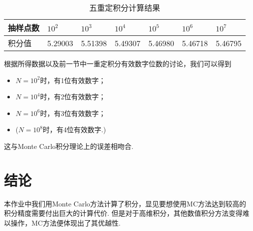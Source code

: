 \documentclass[12pt,a4paper,utf8]{ctexart}
\begin{document}
\begin{table}[htb]
\centering
\begin{tabular}{|l|l|l|l|l|l|l|}
\hline
抽样点数 & $10^2$  & $10^3$  & $10^4$  & $10^5$  & $10^6$  & $10^7$  \\ \hline
积分值  & 5.29003 & 5.51398 & 5.49307 & 5.46980 & 5.46718 & 5.46795 \\ \hline
\end{tabular}
\caption{五重定积分计算结果}
\end{table}

根据所得数据以及前一节中一重定积分有效数字位数的讨论，我们可以得到
\begin{itemize}
    \item $N=10^2$时，有1位有效数字；
    \item $N=10^4$时，有2位有效数字；
    \item $N=10^6$时，有3位有效数字；
    \item ($N=10^8$时，有4位有效数字.)
\end{itemize}

这与Monte Carlo积分理论上的误差相吻合.

\section{结论}

本作业中我们用Monte
Carlo方法计算了积分，显见要想使用MC方法达到较高的积分精度需要付出巨大的计算代价.
但是对于高维积分，其他数值积分方法变得难以操作，MC方法便体现出了其优越性.
\end{document}
